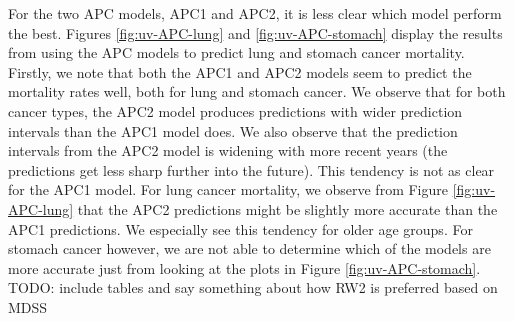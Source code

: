 For the two APC models, APC1 and APC2, it is less clear which model perform the best. Figures \ref{fig:uv-APC-lung} and \ref{fig:uv-APC-stomach} display the results from using the APC models to predict lung and stomach cancer mortality. Firstly, we note that both the APC1 and APC2 models seem to predict the mortality rates well, both for lung and stomach cancer. We observe that for both cancer types, the APC2 model produces predictions with wider prediction intervals than the APC1 model does. We also observe that the prediction intervals from the APC2 model is widening with more recent years (the predictions get less sharp further into the future). This tendency is not as clear for the APC1 model. For lung cancer mortality, we observe from Figure \ref{fig:uv-APC-lung} that the APC2 predictions might be slightly more accurate than the APC1 predictions. We especially see this tendency for older age groups. For stomach cancer however, we are not able to determine which of the models are more accurate just from looking at the plots in Figure \ref{fig:uv-APC-stomach}. \textcolor{myDarkGreen}{TODO: include tables and say something about how RW2 is preferred based on MDSS} 

